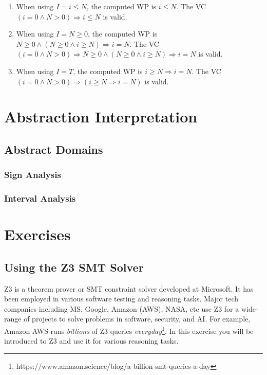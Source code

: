 \documentclass[oneside,11pt,dvipsnames]{book}
\renewcommand{\implies}{\Rightarrow}
\begin{document}
\begin{enumerate}
\item When using $I = i \le N$, the computed WP is $i \le N$. The VC $(i = 0 \land N > 0) \implies i \le N$ is valid.
\item When using $I = N \ge 0$, the computed WP is $N \ge 0 \land (N \ge 0  \land i \ge N)  \implies i = N$. The VC $(i = 0 \land N > 0) \implies N \ge 0 \land (N \ge 0  \land i \ge N)  \implies i = N$ is valid.
\item When using $I = T$, the computed WP is $i \ge N \implies i = N$. The VC $(i = 0 \land N > 0) \implies (i \ge N \implies i = N)$ is valid.
\end{enumerate}

\section{Abstraction Interpretation}\label{sec:abstraction-interpretation}

\subsection{Abstract Domains}\label{sec:abstract-domains}

\subsubsection{Sign Analysis}\label{sec:sign-analysis}

\subsubsection{Interval Analysis}\label{sec:interval-analysis}


\section{Exercises}

\subsection{Using the Z3 SMT Solver}
Z3 is a theorem prover or SMT constraint solver developed at Microsoft.  It has been employed in various software testing and reasoning tasks. Major tech companies including MS, Google, Amazon (AWS), NASA, etc use Z3 for a wide-range of projects to solve problems in software, security, and AI. For example, Amazon AWS runs \emph{billions} of Z3 queries \emph{everyday}\footnote{https://www.amazon.science/blog/a-billion-smt-queries-a-day}.  In this exercise you will be introduced to Z3 and use it for various reasoning tasks.
\end{document}
